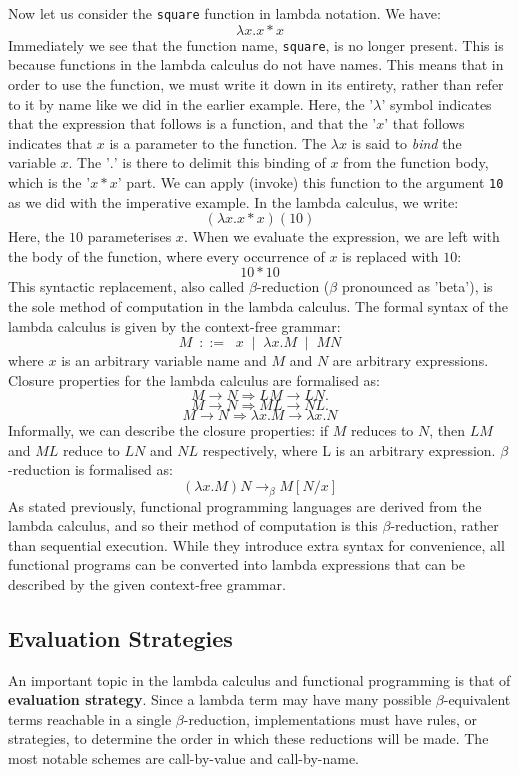 \documentclass{article}
\begin{document}
\indent Now let us consider the \texttt{square} function in lambda notation. We have:
\[ \lambda x.x * x \]
Immediately we see that the function name, \texttt{square}, is no longer present. This is because functions in the lambda calculus do not have names. This means that in order to use the function, we must write it down in its entirety, rather than refer to it by name like we did in the earlier example. Here, the '$\lambda$' symbol indicates that the expression that follows is a function, and that the '$x$' that follows indicates that $x$ is a parameter to the function. The $\lambda x$ is said to \emph{bind} the variable $x$. The '$.$' is there to delimit this binding of $x$ from the function body, which is the '$x * x$' part. We can apply (invoke) this function to the argument \texttt{10} as we did with the imperative example. In the lambda calculus, we write:
\[ (\lambda x.x * x)(10) \]
Here, the $10$ parameterises $x$. When we evaluate the expression, we are left with the body of the function, where every occurrence of $x$ is replaced with $10$:
\[ 10 * 10 \]
This syntactic replacement, also called $\beta$-reduction ($\beta$ pronounced as 'beta'), is the sole method of computation in the lambda calculus. The formal syntax of the lambda calculus is given by the context-free grammar:
\[ M \:\; ::= \;\; x \;\; | \;\; \lambda x.M \;\; | \;\;  MN \]
where $x$ is an arbitrary variable name and $M$ and $N$ are arbitrary expressions. Closure properties for the lambda calculus are formalised as:
\[ M \rightarrow N \Rightarrow LM \rightarrow LN. \]
\[ M \rightarrow N \Rightarrow ML \rightarrow NL. \]
\[ M \rightarrow N \Rightarrow \lambda x.M \rightarrow \lambda x.N \]
Informally, we can describe the closure properties: if $M$ reduces to $N$, then $LM$ and $ML$ reduce to $LN$ and $NL$ respectively, where L is an arbitrary expression. $\beta$-reduction is formalised as:
\[ (\lambda x.M)N \rightarrow_\beta M[N/x] \]
\indent As stated previously, functional programming languages are derived from the lambda calculus, and so their method of computation is this $\beta$-reduction, rather than sequential execution. While they introduce extra syntax for convenience, all functional programs can be converted into lambda expressions that can be described by the given context-free grammar.

\subsection{Evaluation Strategies}
An important topic in the lambda calculus and functional programming is that of \textbf{evaluation strategy}. Since a lambda term may have many possible $\beta$-equivalent terms reachable in a single $\beta$-reduction, implementations must have rules, or strategies, to determine the order in which these reductions will be made. The most notable schemes are call-by-value and call-by-name.
\end{document}
